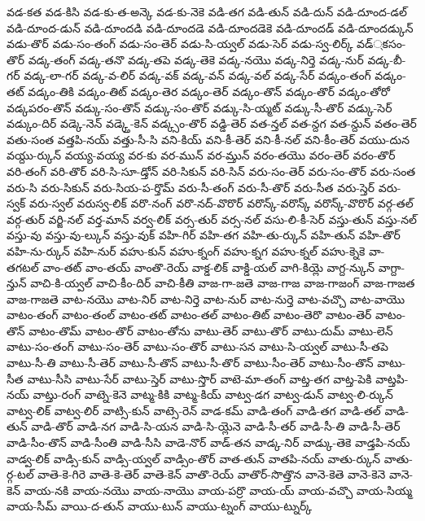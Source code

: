 {వడ-కత
వడ-కిసి
వడ-కు-త-అన్కె
వడ-కు-నెకె
వడి-తగ
వడి-తున్
వడి-దున్
వడి-దూంద-డల్
వడి-దూంద-డున్
వడి-దూందడి
వడి-దూందడె
వడి-దూందడెకె
వడి-దూందడ్
వడి-దూందడ్కున్
వడు-తొర్
వడు-సం-తంగ్
వడు-సం-తెర్
వడు-సి-య్వల్
వడు-సెర్
వడు-స్వ-లిర్క్
వడ్्కసం-తొర్
వడ్క-తంగ్
వడ్క-తనొ
వడ్క-తపె
వడ్క-తెకె
వడ్క-నయొ
వడ్క-నిర్తె
వడ్క-నుర్
వడ్క-బీ-గర్
వడ్క-లా-గర్
వడ్క-వ-లిర్
వడ్క-వక్
వడ్క-వన్
వడ్క-వల్
వడ్క-సేర్
వడ్కం-తంగ్
వడ్కం-తట్
వడ్కం-తికి
వడ్కం-తిట్
వడ్కం-తెర
వడ్కం-తెర్
వడ్కం-తొన్
వడ్కం-తొర్
వడ్కం-తోరో
వడ్కపరం-తొన్
వడ్కు-సం-తొన్
వడ్కు-సం-తొర్
వడ్కు-సి-య్మట్
వడ్కు-సీ-తొర్
వడ్కు-సెర్
వడ్కుం-దిర్
వడ్కె-నెన్
వడ్క్తె-కెన్
వడ్క్సం-తొర్
వడ్డి-తెర్
వత-న్తల్
వత-న్దగ
వత-న్దున్
వతం-తెర్
వతు-సంత
వత్తపి-నయ్
వత్తు-సీ-సి
వని-కియ్
వని-కీ-తెర్
వని-కీ-నల్
వని-కీం-తెర్
వయు-దున
వయ్దు-ర్కున్
వయ్య-వయ్య
వర-కు
వర-మున్
వర-మ్తున్
వరం-తయొ
వరం-తెర్
వరం-తొర్
వరి-తంగ్
వరి-తొర్
వరి-సి-సూ-డ్తోన్
వరి-సికున్
వరి-సిన్
వరు-సం-తెర్
వరు-సం-తొర్
వరు-సంత
వరు-సి
వరు-సికున్
వరు-సియ-ప-ర్తొమ్
వరు-సీ-తంగ్
వరు-సీ-తొర్
వరు-సీత
వరు-స్తెర్
వరు-స్వక్
వరు-స్వల్
వరుస్వ-లిక్
వరొ-నంగ్
వరొ-నద్-వొరొర్
వరొన్క్-వరొన్క్
వరొన్క్-వొరొర్
వర్గ-తల్
వర్గ-తుర్
వర్జి-నల్
వర్త-మాన్
వర్వ-లిక్
వర్స-తుర్
వర్స-నల్
వసు-లి-కీ-సెర్
వస్తు-తున్
వస్తు-నల్
వస్తు-వు
వస్తు-వు-ల్కున్
వస్తు-వుక్
వహి-గిర్
వహి-తగ
వహి-తు-ర్కున్
వహి-తున్
వహి-తొర్
వహి-ను-ర్కున్
వహి-నుర్
వహు-కున్
వహు-క్నంగ్
వహు-క్నగ
వహు-క్నల్
వహు-క్నెకె
వా-తగటల్
వాం-తట్
వాం-తయ్
వాంతొ-రెయ్
వాక్డ-లిక్
వాక్డి-యల్
వాగి-కియ్లె
వాగ్ద-న్కున్
వాగ్దా-న్తున్
వాచి-కి-య్వల్
వాచి-కీం-దిర్
వాచి-కీతి
వాజ-గా-జతె
వాజ-గాజ
వాజ-గాజంగ్
వాజ-గాజత
వాజ-గాజతె
వాట-నయొ
వాట-నిర్
వాట-నిర్తె
వాట-నుర్
వాట-నుర్తె
వాట-వచ్చొ
వాట-వాయొ
వాటం-తంగ్
వాటం-తంల్
వాటం-తట్
వాటం-తల్
వాటం-తిట్
వాటం-తెరొ
వాటం-తెర్
వాటం-తొన్
వాటం-తొమ్
వాటం-తొర్
వాటం-తోను
వాటు-తెర్
వాటు-తొర్
వాటు-దుమ్
వాటు-లెన్
వాటు-సం-తంగ్
వాటు-సం-తెర్
వాటు-సం-తొర్
వాటు-సన
వాటు-సి-య్వల్
వాటు-సీ-తపె
వాటు-సీ-తి
వాటు-సీ-తెర్
వాటు-సీ-తొన్
వాటు-సీ-తొర్
వాటు-సీం-తెర్
వాటు-సీం-తొన్
వాటు-సీత
వాటు-సీసి
వాటు-సేర్
వాటు-స్తెర్
వాటు-స్తొర్
వాటె-మా-తంగ్
వాట్త-తగ
వాట్త-పెకి
వాట్తపి-నయ్
వాట్తు-రంగ్
వాట్నె-కెనె
వాట్మ-కికి
వాట్మ-కియ్
వాట్వ-డగ
వాట్వ-డున్
వాట్వ-లి-ర్కున్
వాట్వ-లిక్
వాట్వ-లిర్
వాట్సి-కున్
వాట్సె-రెన్
వాడ-కమ్
వాడి-తంగ్
వాడి-తగ
వాడి-తల్
వాడి-తున్
వాడి-తొర్
వాడి-నగ
వాడి-సి-యన
వాడి-సి-య్లెనె
వాడి-సీ-తర్
వాడి-సీ-తి
వాడి-సీ-తెర్
వాడి-సీం-తొన్
వాడి-సీంతి
వాడి-సీసి
వాడె-నొర్
వాడ్-తన
వాడ్క-నిర్
వాడ్కు-తెకె
వాడ్తపి-నయ్
వాడ్వ-లిక్
వాడ్సి-కున్
వాడ్సి-య్వల్
వాడ్సిం-తొర్
వాత-తున్
వాతపి-నయ్
వాతు-ర్కున్
వాతు-ర్గ-టల్
వాతె-కె-గిరె
వాతె-కె-తెర్
వాతె-కెన్
వాతొ-రెయ్
వాతొర్-సొత్తొన
వానె-కెతె
వానె-కెనె
వానె-కెన్
వాయ-నకి
వాయ-నయొ
వాయ-నాయొ
వాయ-పర్రొ
వాయ-య్
వాయ-వచ్చొ
వాయ-సియ్మ
వాయ-సీమ్
వాయి-ద-తున్
వాయు-టున్
వాయు-ట్నంగ్
వాయు-ట్నుర్క్
}
